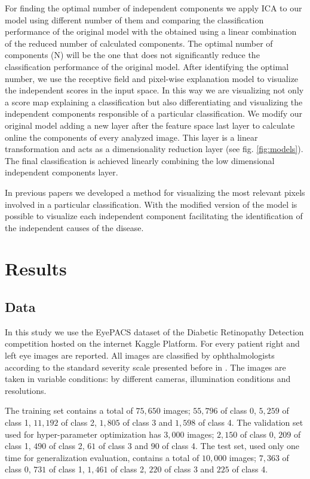 \documentclass{llncs}
\begin{document}
For finding the optimal number of independent components we apply ICA to our model using different number of them and comparing the classification performance of the original model with the obtained using a linear combination of the reduced number of calculated components. The optimal number of components (N) will be the one that does not significantly reduce the classification performance of the original model. After identifying the optimal number, we use the receptive field and pixel-wise explanation model to visualize the independent scores in the input space. In this way we are visualizing not only a score map explaining a classification but also differentiating and visualizing the independent components responsible of a particular classification. We modify our original model adding a new layer after the feature space last layer to calculate online the components of every analyzed image. This layer is a linear transformation and acts as a dimensionality reduction layer (see fig. \ref{fig:models}). The final classification is achieved linearly combining the low dimensional independent components layer.

In previous papers we developed a method for visualizing the most relevant pixels involved in a particular classification. With the modified version of the model is possible to visualize each independent component facilitating the identification of the independent causes of the disease.

\section{Results}\label{sec:results}

\subsection{Data}

In this study we use the EyePACS dataset of the Diabetic Retinopathy Detection competition hosted on the internet Kaggle Platform.  For every patient right and left eye images are reported. All images are classified by ophthalmologists according to the standard severity scale presented before in \cite{diaclass}. The images are taken in variable conditions: by different cameras, illumination conditions and resolutions. 

The training set contains a total of $75,650$ images; $55,796$ of class 0, $5,259$ of class 1, $11,192$ of class 2, $1,805$ of class 3 and $1,598$ of class 4. The validation set used for hyper-parameter optimization has $3,000$ images; $2,150$ of class 0, $209$ of class 1, $490$ of class 2, $61$ of class 3 and $90$ of class 4. The test set, used only one time for generalization evaluation, contains a total of $10,000$ images; $7,363$ of class 0, $731$ of class 1, $1,461$ of class 2, $220$ of class 3 and $225$ of class 4. 
\end{document}
